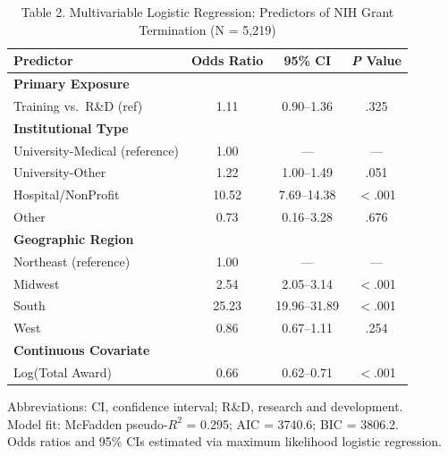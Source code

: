 \begin{table}[htbp]
\centering
\caption{Table 2. Multivariable Logistic Regression: Predictors of NIH Grant Termination (N = 5,219)}
\label{tab:table2}
\small
\begin{tabular}{@{}lccc@{}}
\toprule
\textbf{Predictor} & \textbf{Odds Ratio} & \textbf{95\% CI} & \textbf{\textit{P} Value} \\
\midrule
\textbf{Primary Exposure} & & & \\
\quad Training vs.\ R\&D (ref) & 1.11 & 0.90–1.36 & .325 \\
\addlinespace
\textbf{Institutional Type} & & & \\
\quad University-Medical (reference) & 1.00 & --- & --- \\
\quad University-Other & 1.22 & 1.00–1.49 & .051 \\
\quad Hospital/NonProfit & 10.52 & 7.69–14.38 & $<$.001 \\
\quad Other & 0.73 & 0.16–3.28 & .676 \\
\addlinespace
\textbf{Geographic Region} & & & \\
\quad Northeast (reference) & 1.00 & --- & --- \\
\quad Midwest & 2.54 & 2.05–3.14 & $<$.001 \\
\quad South & 25.23 & 19.96–31.89 & $<$.001 \\
\quad West & 0.86 & 0.67–1.11 & .254 \\
\addlinespace
\textbf{Continuous Covariate} & & & \\
\quad Log(Total Award) & 0.66 & 0.62–0.71 & $<$.001 \\
\bottomrule
\end{tabular}
\begin{flushleft}
\footnotesize Abbreviations: CI, confidence interval; R\&D, research and development. \\
Model fit: McFadden pseudo-$R^2$ = 0.295; AIC = 3740.6; BIC = 3806.2. \\
Odds ratios and 95\% CIs estimated via maximum likelihood logistic regression.
\end{flushleft}
\end{table}
